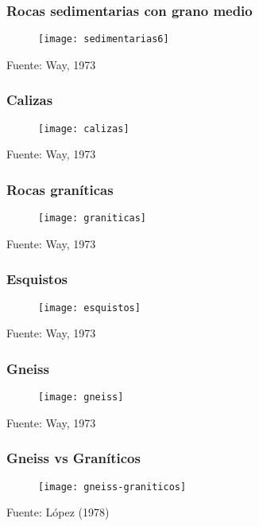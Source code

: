 \documentclass[14pt]{beamer}
\begin{document}
  \begin{frame}
\frametitle{Rocas sedimentarias con grano medio}
 \begin{figure}
    \centering
    \texttt{[image: sedimentarias6]}
  \end{figure}
  \tiny{Fuente: Way, 1973}
\end{frame}
  \begin{frame}
\frametitle{Calizas}
 \begin{figure}
    \centering
    \texttt{[image: calizas]}
  \end{figure}
  \tiny{Fuente: Way, 1973}
\end{frame}
  \begin{frame}
\frametitle{Rocas graníticas}
 \begin{figure}
    \centering
    \texttt{[image: graniticas]}
  \end{figure}
  \tiny{Fuente: Way, 1973}
\end{frame}
  \begin{frame}
\frametitle{Esquistos}
 \begin{figure}
    \centering
    \texttt{[image: esquistos]}
  \end{figure}
  \tiny{Fuente: Way, 1973}
\end{frame}
  \begin{frame}
\frametitle{Gneiss}
 \begin{figure}
    \centering
    \texttt{[image: gneiss]}
  \end{figure}
  \tiny{Fuente: Way, 1973}
\end{frame}
  \begin{frame}
\frametitle{Gneiss vs Graníticos}
 \begin{figure}
    \centering
    \texttt{[image: gneiss-graniticos]}
  \end{figure}
  \tiny{Fuente: López (1978)}
\end{frame}
\end{document}
